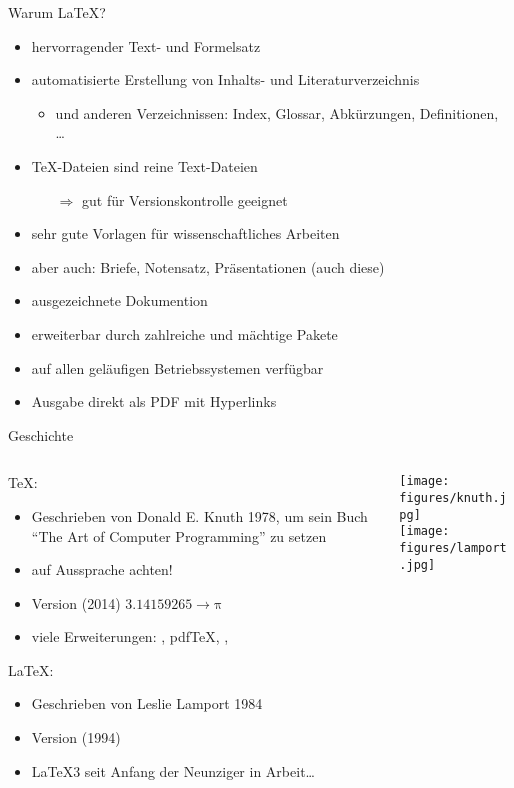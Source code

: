 \begin{frame}{Warum \LaTeX?}
  \begin{itemize}
    \item hervorragender Text- und Formelsatz
    \item automatisierte Erstellung von Inhalts- und Literaturverzeichnis
      \begin{itemize}
        \item und anderen Verzeichnissen: Index, Glossar, Abkürzungen, Definitionen, …
      \end{itemize}
    \item \TeX-Dateien sind reine Text-Dateien
      \begin{itemize}
        \item[$\Rightarrow$] gut für Versionskontrolle geeignet
      \end{itemize}
    \item sehr gute Vorlagen für wissenschaftliches Arbeiten
    \item aber auch: Briefe, Notensatz, Präsentationen (auch diese)
    \item ausgezeichnete Dokumention
    \item erweiterbar durch zahlreiche und mächtige Pakete
    \item auf allen geläufigen Betriebssystemen verfügbar
    \item Ausgabe direkt als PDF mit Hyperlinks
  \end{itemize}
\end{frame}

\begin{frame}{Geschichte}
  \begin{columns}
    \begin{column}{0.75\textwidth}
      \TeX:
      \begin{itemize}
        \item Geschrieben von Donald E. Knuth 1978, um sein Buch \enquote{The Art of Computer Programming} zu setzen
        \item auf Aussprache achten!
        \item Version (2014) $3.14159265 → \mathup{π}$
        \item viele Erweiterungen: \eTeX, pdf\TeX, \XeTeX, \LuaTeX
      \end{itemize}

      \vspace{10pt}
      \LaTeX:
      \begin{itemize}
        \item Geschrieben von Leslie Lamport 1984
        \item Version (1994) \LaTeXe
        \item \LaTeX3 seit Anfang der Neunziger in Arbeit…
      \end{itemize}
    \end{column}
    \begin{column}{0.25\textwidth}
      \texttt{[image: figures/knuth.jpg]}\\
      \texttt{[image: figures/lamport.jpg]}
    \end{column}
  \end{columns}
\end{frame}


